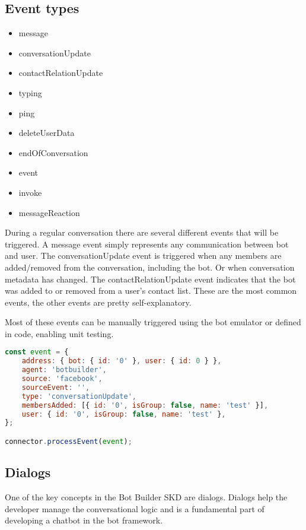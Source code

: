 \newpage

\subsection{Event types}
\begin{itemize}
	\item message
	\item conversationUpdate
	\item contactRelationUpdate
	\item typing
	\item ping
	\item deleteUserData
	\item endOfConversation
	\item event
	\item invoke
	\item messageReaction
\end{itemize}

During a regular conversation there are several different events that will be triggered. A message event simply represents any communication between bot and user. The conversationUpdate event is triggered when any members are added/removed from the conversation, including the bot. Or when conversation metadata has changed. The contactRelationUpdate event indicates that the bot was added to or removed from a user's contact list.
These are the most common events, the other events are pretty self-explanatory.

Most of these events can be manually triggered using the bot emulator or defined in code, enabling unit testing.

\begin{lstlisting}[language=JavaScript,caption=Sending a mock event to the bot,label=listing:botframework-mock-event]
const event = {
	address: { bot: { id: '0' }, user: { id: 0 } },
	agent: 'botbuilder',
	source: 'facebook',
	sourceEvent: '',
	type: 'conversationUpdate',
	membersAdded: [{ id: '0', isGroup: false, name: 'test' }],
	user: { id: '0', isGroup: false, name: 'test' },
};

connector.processEvent(event);
\end{lstlisting}

\subsection{Dialogs}

One of the key concepts in the Bot Builder SKD are dialogs. Dialogs help the developer manage the conversational logic and is a fundamental part of developing a chatbot in the bot framework.


